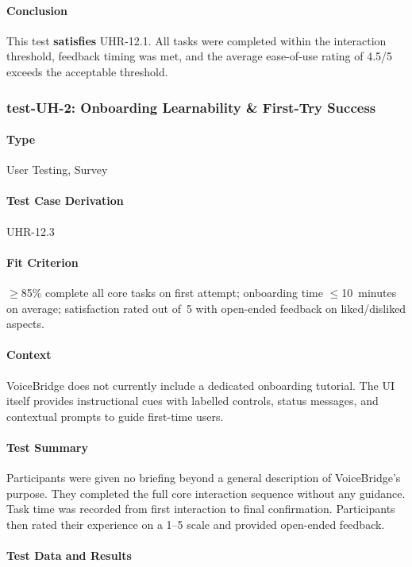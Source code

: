 \documentclass[12pt, titlepage]{article}
\begin{document}
\paragraph{Conclusion}
This test \textbf{satisfies} UHR-12.1. All tasks were completed within the
interaction threshold, feedback timing was met, and the average ease-of-use
rating of 4.5/5 exceeds the acceptable threshold.

\subsubsection{test-UH-2: Onboarding Learnability \& First-Try Success}

\paragraph{Type} User Testing, Survey

\paragraph{Test Case Derivation} UHR-12.3

\paragraph{Fit Criterion}
$\geq$85\% complete all core tasks on first attempt; onboarding time
$\leq$10~minutes on average; satisfaction rated out of~5 with open-ended
feedback on liked/disliked aspects.

\paragraph{Context}
VoiceBridge does not currently include a dedicated onboarding tutorial. The
UI itself provides instructional cues with labelled controls, status messages,
and contextual prompts to guide first-time users.

\paragraph{Test Summary}
Participants were given no briefing beyond a general description of
VoiceBridge's purpose. They completed the full core interaction sequence
without any guidance. Task time was recorded from first interaction to final
confirmation. Participants then rated their experience on a 1--5 scale and
provided open-ended feedback.

\paragraph{Test Data and Results}
\end{document}
